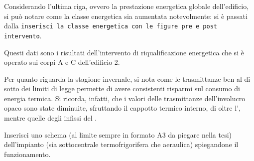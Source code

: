 Considerando l'ultima riga, ovvero la prestazione energetica globale dell'edificio, si può notare come la classe energetica sia aumentata notevolmente: si è passati  dalla \texttt{inserisci la classe energetica con le figure pre e post intervento}.

Questi dati sono i risultati dell'intervento di riqualificazione energetica che si è operato sui corpi A e C dell'edificio 2. 

Per quanto riguarda la stagione invernale, si nota come le trasmittanze ben al di sotto dei limiti di legge permette di avere consistenti risparmi sul consumo di energia termica. Si ricorda, infatti, che i valori delle trasmittanze dell'involucro opaco sono state diminuite, sfruttando il cappotto termico interno, di oltre l', mentre quelle degli infissi del . 

Inserisci uno schema (al limite sempre in formato A3 da piegare nella tesi) dell'impianto (sia sottocentrale termofrigorifera che aeraulica) spiegandone il funzionamento.